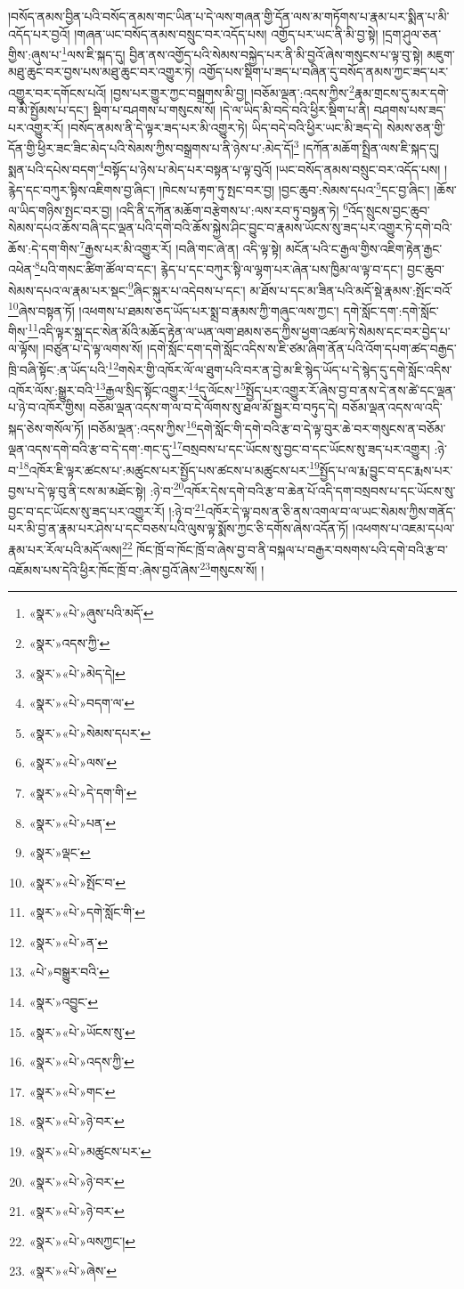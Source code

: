 །བསོད་ནམས་བྱིན་པའི་བསོད་ནམས་གང་ཡིན་པ་དེ་ལས་གཞན་གྱི་དོན་ལས་མ་གཏོགས་པ་རྣམ་པར་སྨིན་པ་མི་འདོད་པར་བྱའོ། །གཞན་ཡང་བསོད་ནམས་བསྲུང་བར་འདོད་པས། འགྱོད་པར་ཡང་ནི་མི་བྱ་སྟེ། །དྲག་ཤུལ་ཅན་གྱིས་:ཞུས་པ་\footnote{«སྣར་»«པེ་»ཞུས་པའི་མདོ་}ལས་ཇི་སྐད་དུ། བྱིན་ནས་འགྱོད་པའི་སེམས་བསྐྱེད་པར་ནི་མི་བྱའོ་ཞེས་གསུངས་པ་ལྟ་བུ་སྟེ། མཇུག་མཐུ་ཆུང་བར་བྱས་པས་མཐུ་ཆུང་བར་འགྱུར་ཏེ། འགྱོད་པས་སྡིག་པ་ཟད་པ་བཞིན་དུ་བསོད་ནམས་ཀྱང་ཟད་པར་འགྱུར་བར་དགོངས་པའོ། །བྱས་པར་གྱུར་ཀྱང་བསྒྲགས་མི་བྱ། །བཅོམ་ལྡན་:འདས་ཀྱིས་\footnote{«སྣར་»འདས་ཀྱི་}རྣམ་གྲངས་དུ་མར་དགེ་བ་མི་སྤྱོམས་པ་དང་། སྡིག་པ་བཤགས་པ་གསུངས་སོ། །དེ་ལ་ཡིད་མི་བདེ་བའི་ཕྱིར་སྡིག་པ་ནི། བཤགས་པས་ཟད་པར་འགྱུར་རོ། །བསོད་ནམས་ནི་དེ་ལྟར་ཟད་པར་མི་འགྱུར་ཏེ། ཡིད་བདེ་བའི་ཕྱིར་ཡང་མི་ཟད་དེ། སེམས་ཅན་གྱི་དོན་གྱི་ཕྱིར་ཟང་ཟིང་མེད་པའི་སེམས་ཀྱིས་བསྒྲགས་པ་ནི་ཉེས་པ་:མེད་དོ།\footnote{«སྣར་»«པེ་»མེད་དེ།} །དཀོན་མཆོག་སྤྲིན་ལས་ཇི་སྐད་དུ། སྨན་པའི་དཔེས་བདག་\footnote{«སྣར་»«པེ་»བདག་ལ་}བསྟོད་པ་ཉེས་པ་མེད་པར་བསྟན་པ་ལྟ་བུའོ། །ཡང་བསོད་ནམས་བསྲུང་བར་འདོད་པས། །རྙེད་དང་བཀུར་སྟིས་འཇིགས་བྱ་ཞིང་། །ཁེངས་པ་རྟག་ཏུ་སྤང་བར་བྱ། །བྱང་ཆུབ་:སེམས་དཔའ་\footnote{«སྣར་»«པེ་»སེམས་དཔར་}དང་བྱ་ཞིང་། །ཆོས་ལ་ཡིད་གཉིས་སྤང་བར་བྱ། །འདི་ནི་དཀོན་མཆོག་བརྩེགས་པ་:ལས་རབ་ཏུ་བསྟན་ཏེ། \footnote{«སྣར་»«པེ་»ལས་}འོད་སྲུངས་བྱང་ཆུབ་སེམས་དཔའ་ཆོས་བཞི་དང་ལྡན་པའི་དགེ་བའི་ཆོས་སྐྱེས་ཤིང་བྱུང་བ་རྣམས་ཡོངས་སུ་ཟད་པར་འགྱུར་ཏེ་དགེ་བའི་ཆོས་:དེ་དག་གིས་\footnote{«སྣར་»«པེ་»དེ་དག་གི་}རྒྱས་པར་མི་འགྱུར་རོ། །བཞི་གང་ཞེ་ན། འདི་ལྟ་སྟེ། མངོན་པའི་ང་རྒྱལ་གྱིས་འཇིག་རྟེན་རྒྱང་འཕེན་\footnote{«སྣར་»«པེ་»པན་}པའི་གསང་ཚིག་ཚོལ་བ་དང་། རྙེད་པ་དང་བཀུར་སྟི་ལ་ལྷག་པར་ཞེན་པས་ཁྱིམ་ལ་ལྟ་བ་དང་། བྱང་ཆུབ་སེམས་དཔའ་ལ་རྣམ་པར་སྡང་\footnote{«སྣར་»ལྡང་}ཞིང་སྐུར་པ་འདེབས་པ་དང་། མ་ཐོས་པ་དང་མ་ཟིན་པའི་མདོ་སྡེ་རྣམས་:སྤོང་བའོ་\footnote{«སྣར་»«པེ་»སྤོང་བ་}ཞེས་བསྟན་ཏོ། །འཕགས་པ་ཐམས་ཅད་ཡོད་པར་སྨྲ་བ་རྣམས་ཀྱི་གཞུང་ལས་ཀྱང་། དགེ་སློང་དག་:དགེ་སློང་གིས་\footnote{«སྣར་»«པེ་»དགེ་སློང་གི་}འདི་ལྟར་སྐྲ་དང་སེན་མོའི་མཆོད་རྟེན་ལ་ཡན་ལག་ཐམས་ཅད་ཀྱིས་ཕྱག་འཚལ་ཏེ་སེམས་དང་བར་བྱེད་པ་ལ་ལྟོས། །བཙུན་པ་དེ་ལྟ་ལགས་སོ། །དགེ་སློང་དག་དགེ་སློང་འདིས་ས་ཇི་ཙམ་ཞིག་ནོན་པའི་འོག་དཔག་ཚད་བརྒྱད་ཁྲི་བཞི་སྟོང་:ན་ཡོད་པའི་\footnote{«སྣར་»«པེ་»ན་}གསེར་གྱི་འཁོར་ལོ་ལ་ཐུག་པའི་བར་ན་བྱེ་མ་ཇི་སྙེད་ཡོད་པ་དེ་སྙེད་དུ་དགེ་སློང་འདིས་འཁོར་ལོས་:སྒྱུར་བའི་\footnote{«པེ་»བསྒྱུར་བའི་}རྒྱལ་སྲིད་སྟོང་འགྱུར་\footnote{«སྣར་»འབྱུང་}དུ་ལོངས་\footnote{«སྣར་»«པེ་»ཡོངས་སུ་}སྤྱོད་པར་འགྱུར་རོ་ཞེས་བྱ་བ་ནས་དེ་ནས་ཚེ་དང་ལྡན་པ་ཉེ་བ་འཁོར་གྱིས། བཅོམ་ལྡན་འདས་ག་ལ་བ་དེ་ལོགས་སུ་ཐལ་མོ་སྦྱར་བ་བཏུད་དེ། བཅོམ་ལྡན་འདས་ལ་འདི་སྐད་ཅེས་གསོལ་ཏོ། །བཅོམ་ལྡན་:འདས་ཀྱིས་\footnote{«སྣར་»«པེ་»འདས་ཀྱི་}དགེ་སློང་གི་དགེ་བའི་རྩ་བ་དེ་ལྟ་བུར་ཆེ་བར་གསུངས་ན་བཅོམ་ལྡན་འདས་དགེ་བའི་རྩ་བ་དེ་དག་:གང་དུ་\footnote{«སྣར་»«པེ་»གང་}བསྲབས་པ་དང་ཡོངས་སུ་བྱང་བ་དང་ཡོངས་སུ་ཟད་པར་འགྱུར། :ཉེ་བ་\footnote{«སྣར་»«པེ་»ཉེ་བར་}འཁོར་ཇི་ལྟར་ཚངས་པ་:མཚུངས་པར་སྤྱོད་པས་ཚངས་པ་མཚུངས་པར་\footnote{«སྣར་»«པེ་»མཚུངས་པར་}སྤྱོད་པ་ལ་རྨ་བྱུང་བ་དང་རྨས་པར་བྱས་པ་དེ་ལྟ་བུ་ནི་ངས་མ་མཐོང་སྟེ། :ཉེ་བ་\footnote{«སྣར་»«པེ་»ཉེ་བར་}འཁོར་དེས་དགེ་བའི་རྩ་བ་ཆེན་པོ་འདི་དག་བསྲབས་པ་དང་ཡོངས་སུ་བྱང་བ་དང་ཡོངས་སུ་ཟད་པར་འགྱུར་རོ། །:ཉེ་བ་\footnote{«སྣར་»«པེ་»ཉེ་བར་}འཁོར་དེ་ལྟ་བས་ན་ཅི་ནས་འགལ་བ་ལ་ཡང་སེམས་ཀྱིས་གནོད་པར་མི་བྱ་ན་རྣམ་པར་ཤེས་པ་དང་བཅས་པའི་ལུས་ལྟ་སྨོས་ཀྱང་ཅི་དགོས་ཞེས་འདོན་ཏོ། །འཕགས་པ་འཇམ་དཔལ་རྣམ་པར་རོལ་པའི་མདོ་ལས།\footnote{«སྣར་»«པེ་»ལསཀྱང་།} ཁོང་ཁྲོ་བ་ཁོང་ཁྲོ་བ་ཞེས་བྱ་བ་ནི་བསྐལ་པ་བརྒྱར་བསགས་པའི་དགེ་བའི་རྩ་བ་འཇོམས་པས་དེའི་ཕྱིར་ཁོང་ཁྲོ་བ་:ཞེས་བྱའོ་ཞེས་\footnote{«སྣར་»«པེ་»ཞེས་}གསུངས་སོ། །
